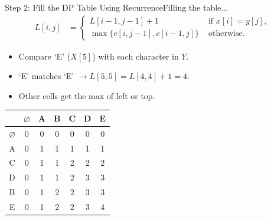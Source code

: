 \documentclass[aspectratio=169]{beamer}
\begin{document}
\begin{frame}{Step 2: Fill the DP Table Using Recurrence}{Filling the table...}
    \vspace{-10mm}
    \scriptsize
    \begin{equation*}
        \begin{align*}
            L[i, j] &=
                        \begin{cases}
                            L[i - 1, j - 1] + 1 & \text{ if } x[i] = y[j] \text{, } \\
                            \max \{ c[i, j - 1], c[i - 1, j] \} & \text{ otherwise.}
                        \end{cases}
        \end{align*}
    \end{equation*}
    \begin{itemize}
        \item Compare `E' ($X[5]$) with each character in $Y$.
        \item `E' matches `E' $\longrightarrow L[5,5] = L[4,4] + 1 = 4$.
        \item Other cells get the max of left or top.
    \end{itemize}
    \vspace{6mm}
    \normalsize
    \centering
    \begin{tabular}{|c|c|c|c|c|c|c|} \hline
                      & $\varnothing$ & A & B & C & D & E \\ \hline
        $\varnothing$ &        0      & 0 & 0 & 0 & 0 & 0 \\ \hline
               A      &        0      & 1 & 1 & 1 & 1 & 1 \\ \hline
               C      &        0      & 1 & 1 & 2 & 2 & 2 \\ \hline
               D      &        0      & 1 & 1 & 2 & 3 & 3 \\ \hline
               B      &        0      & 1 & 2 & 2 & 3 & 3 \\ \hline
               E      &        0      & 1 & 2 & 2 & 3 & 4 \\ \hline
    \end{tabular}
\end{frame}
\end{document}
